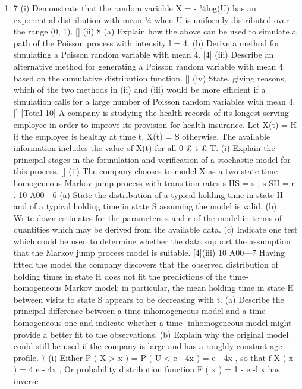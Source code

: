 \documentclass[a4paper,1pt]{article}
\begin{document}
\begin{enumerate}
\item

7
(i)
Demonstrate that the random variable
X = - 1⁄4log(U)
has an exponential distribution with mean 1⁄4 when U is uniformly distributed
over the range (0, 1).
[]
(ii)
8
(a) Explain how the above can be used to simulate a path of the Poisson
process with intensity l = 4.
(b) Derive a method for simulating a Poisson random variable with
mean 4.
[4]
(iii) Describe an alternative method for generating a Poisson random variable with
mean 4 based on the cumulative distribution function.
[]
(iv) State, giving reasons, which of the two methods in (ii) and (iii) would be more
efficient if a simulation calls for a large number of Poisson random variables
with mean 4.
[]
[Total 10]
A company is studying the health records of its longest serving employee in order to
improve its provision for health insurance. Let X(t) = H if the employee is healthy at
time t, X(t) = S otherwise. The available information includes the value of X(t) for all
0 £ t £ T.
(i) Explain the principal stages in the formulation and verification of a stochastic
model for this process.
[]
(ii) The company chooses to model X as a two-state time-homogeneous Markov
jump process with transition rates s HS = s , s SH = r .
10 A00—6
(a) State the distribution of a typical holding time in state H and of a
typical holding time in state S assuming the model is valid.
(b) Write down estimates for the parameters s and r of the model in terms
of quantities which may be derived from the available data.
(c) Indicate one test which could be used to determine whether the data
support the assumption that the Markov jump process model is
suitable.
[4](iii)
10 A00—7
Having fitted the model the company discovers that the observed distribution
of holding times in state H does not fit the predictions of the time-
homogeneous Markov model; in particular, the mean holding time in state H
between visits to state S appears to be decreasing with t.
(a) Describe the principal difference between a time-inhomogeneous
model and a time-homogeneous one and indicate whether a time-
inhomogeneous model might provide a better fit to the observations.
(b) Explain why the original model could still be used if the company is
large and has a roughly constant age profile.
7
(i) Either P ( X > x ) = P ( U < e - 4x ) = e - 4x , so that f X ( x ) = 4 e - 4x ,
Or probability distribution function F ( x ) = 1 - e -l x has inverse

\end{enumerate}
\end{document}
